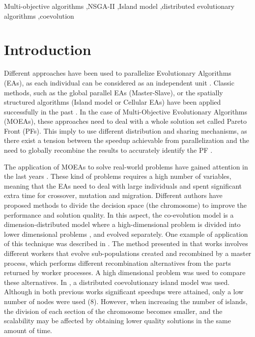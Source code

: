 \documentclass[preprint]{elsarticle}
\begin{document}
\begin{frontmatter}
\begin{keyword}
Multi-objective algorithms \sep NSGA-II \sep Island model \sep distributed evolutionary algorithms \sep coevolution
\end{keyword}

\end{frontmatter}





\section{Introduction}

Different approaches have been used to parallelize Evolutionary Algorithms (EAs), as each individual can be considered as an independent unit \citep{Alba13parallel}. Classic methods, such as the global parallel EAs (Master-Slave), or the spatially structured algorithms (Island model or Cellular EAs) have been applied successfully in the past \citep{Folino03cellular,Alba02Parallelism}.  In the case of Multi-Objective Evolutionary Algorithms (MOEAs), these approaches \citep{Luna15Survey} need to deal with a whole solution set called Pareto Front (PFs). This imply to use different distribution and sharing mechanisms, as there exist a tension between the speedup achievable from parallelization and the need to globally recombine the results to accurately identify the PF \citep{Branke04Parallelizingcone}.


The application of MOEAs to solve real-world problems have gained attention in the last years \citep{Luna15Survey,Mukhopadhyay14Survey,Chavez15MO,Hidalgo16residualstress}. These kind of problems requires a high number of variables, meaning that the EAs need to deal with large individuals and spent significant extra time for crossover, mutation and migration. Different authors have proposed methods to divide the decision space (the chromosome) to improve the performance and solution quality. In this aspect, the co-evolution model is a dimension-distributed model where a high-dimensional problem is divided into lower dimensional problems \citep{Gong15models,Tonda12cooperative}, and evolved separately. One example of application of this technique was described in \citep{Kimovski15Parallel}. The method presented in that works involves different workers that evolve sub-populations created and recombined by a master process, which performs different recombination alternatives from the parts returned by worker processes. A high dimensional problem was used to compare these
alternatives. In \citep{Dorronsoro13superlinear}, a distributed coevolutionary island model was used.  Although in both previous works significant speedups were attained, only a low number of nodes were used (8). However, when increasing the number of islands, the division of each section of the chromosome becomes smaller, and the scalability may be affected by obtaining lower quality solutions in the same amount of time.
\end{document}
